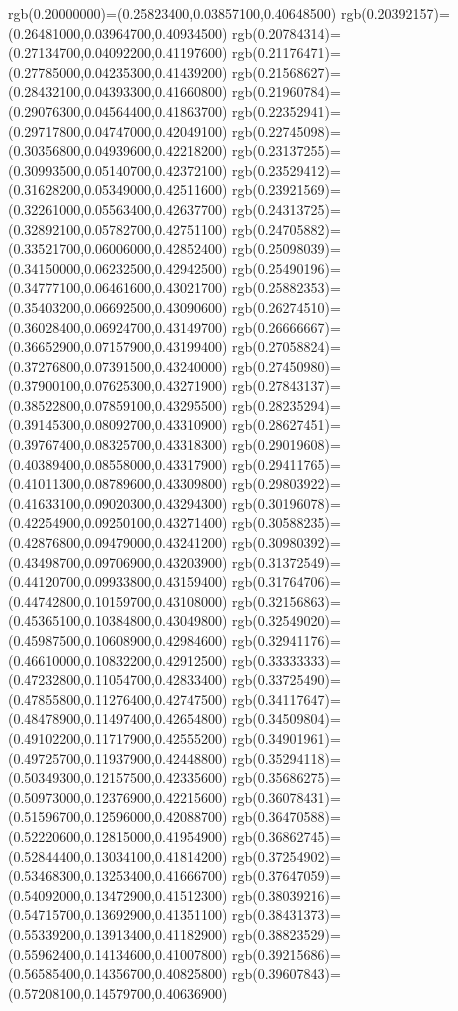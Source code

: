 {{rgb(0.20000000)=(0.25823400,0.03857100,0.40648500)
rgb(0.20392157)=(0.26481000,0.03964700,0.40934500)
rgb(0.20784314)=(0.27134700,0.04092200,0.41197600)
rgb(0.21176471)=(0.27785000,0.04235300,0.41439200)
rgb(0.21568627)=(0.28432100,0.04393300,0.41660800)
rgb(0.21960784)=(0.29076300,0.04564400,0.41863700)
rgb(0.22352941)=(0.29717800,0.04747000,0.42049100)
rgb(0.22745098)=(0.30356800,0.04939600,0.42218200)
rgb(0.23137255)=(0.30993500,0.05140700,0.42372100)
rgb(0.23529412)=(0.31628200,0.05349000,0.42511600)
rgb(0.23921569)=(0.32261000,0.05563400,0.42637700)
rgb(0.24313725)=(0.32892100,0.05782700,0.42751100)
rgb(0.24705882)=(0.33521700,0.06006000,0.42852400)
rgb(0.25098039)=(0.34150000,0.06232500,0.42942500)
rgb(0.25490196)=(0.34777100,0.06461600,0.43021700)
rgb(0.25882353)=(0.35403200,0.06692500,0.43090600)
rgb(0.26274510)=(0.36028400,0.06924700,0.43149700)
rgb(0.26666667)=(0.36652900,0.07157900,0.43199400)
rgb(0.27058824)=(0.37276800,0.07391500,0.43240000)
rgb(0.27450980)=(0.37900100,0.07625300,0.43271900)
rgb(0.27843137)=(0.38522800,0.07859100,0.43295500)
rgb(0.28235294)=(0.39145300,0.08092700,0.43310900)
rgb(0.28627451)=(0.39767400,0.08325700,0.43318300)
rgb(0.29019608)=(0.40389400,0.08558000,0.43317900)
rgb(0.29411765)=(0.41011300,0.08789600,0.43309800)
rgb(0.29803922)=(0.41633100,0.09020300,0.43294300)
rgb(0.30196078)=(0.42254900,0.09250100,0.43271400)
rgb(0.30588235)=(0.42876800,0.09479000,0.43241200)
rgb(0.30980392)=(0.43498700,0.09706900,0.43203900)
rgb(0.31372549)=(0.44120700,0.09933800,0.43159400)
rgb(0.31764706)=(0.44742800,0.10159700,0.43108000)
rgb(0.32156863)=(0.45365100,0.10384800,0.43049800)
rgb(0.32549020)=(0.45987500,0.10608900,0.42984600)
rgb(0.32941176)=(0.46610000,0.10832200,0.42912500)
rgb(0.33333333)=(0.47232800,0.11054700,0.42833400)
rgb(0.33725490)=(0.47855800,0.11276400,0.42747500)
rgb(0.34117647)=(0.48478900,0.11497400,0.42654800)
rgb(0.34509804)=(0.49102200,0.11717900,0.42555200)
rgb(0.34901961)=(0.49725700,0.11937900,0.42448800)
rgb(0.35294118)=(0.50349300,0.12157500,0.42335600)
rgb(0.35686275)=(0.50973000,0.12376900,0.42215600)
rgb(0.36078431)=(0.51596700,0.12596000,0.42088700)
rgb(0.36470588)=(0.52220600,0.12815000,0.41954900)
rgb(0.36862745)=(0.52844400,0.13034100,0.41814200)
rgb(0.37254902)=(0.53468300,0.13253400,0.41666700)
rgb(0.37647059)=(0.54092000,0.13472900,0.41512300)
rgb(0.38039216)=(0.54715700,0.13692900,0.41351100)
rgb(0.38431373)=(0.55339200,0.13913400,0.41182900)
rgb(0.38823529)=(0.55962400,0.14134600,0.41007800)
rgb(0.39215686)=(0.56585400,0.14356700,0.40825800)
rgb(0.39607843)=(0.57208100,0.14579700,0.40636900)
}}
